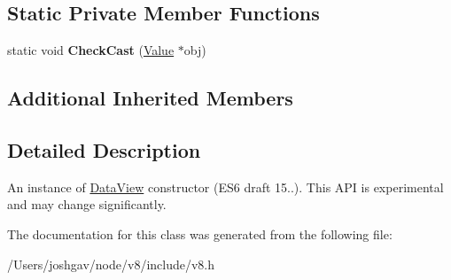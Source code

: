 \subsection*{Static Private Member Functions}
\begin{DoxyCompactItemize}
\item 
static void {\bfseries Check\+Cast} (\hyperlink{classv8_1_1_value}{Value} $\ast$obj)\hypertarget{classv8_1_1_data_view_ac7b128682169a4ac22395bfcbbb6b9f7}{}\label{classv8_1_1_data_view_ac7b128682169a4ac22395bfcbbb6b9f7}

\end{DoxyCompactItemize}
\subsection*{Additional Inherited Members}


\subsection{Detailed Description}
An instance of \hyperlink{classv8_1_1_data_view}{Data\+View} constructor (E\+S6 draft 15..). This A\+PI is experimental and may change significantly. 

The documentation for this class was generated from the following file\+:\begin{DoxyCompactItemize}
\item 
/\+Users/joshgav/node/v8/include/v8.\+h\end{DoxyCompactItemize}
